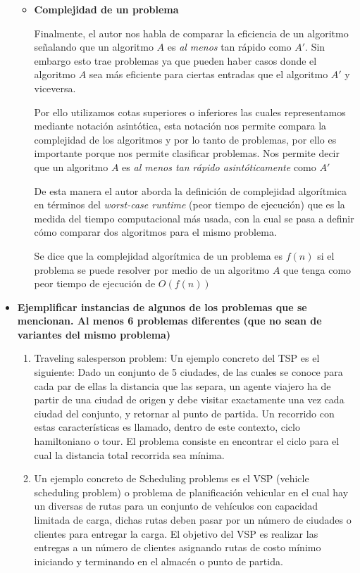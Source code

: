 \documentclass[12pt,letterpaper]{article}
\begin{document}
\begin{itemize}
\begin{itemize}[$\blacklozenge$]
    \item \textbf{Complejidad de un problema}
    
    Finalmente, el autor nos habla de comparar la eficiencia de un algoritmo señalando que un algoritmo $A$ es \textit{al menos} tan rápido como $A'$. Sin embargo esto trae problemas ya que pueden haber casos donde el algoritmo $A$ sea más eficiente para ciertas entradas que el algoritmo $A'$ y viceversa.
    
    Por ello utilizamos cotas superiores o inferiores las cuales representamos mediante notación asintótica, esta notación nos permite compara la complejidad de los algoritmos y por lo tanto de problemas, por ello es importante porque nos permite clasificar problemas. Nos permite decir que un algoritmo $A$ es \textit{al menos tan rápido asintóticamente} como $A'$
    
    De esta manera el autor aborda la definición de complejidad algorítmica en términos del \textit{worst-case runtime} (peor tiempo de ejecución) que es la medida del tiempo computacional más usada, con la cual se pasa a definir cómo comparar dos algoritmos para el mismo problema. 
    
    Se dice que la complejidad algorítmica de un problema es $f(n)$ si el problema se puede resolver por medio de un algoritmo $A$ que tenga como peor tiempo de ejecución de $O(f(n))$
\end{itemize}
\newpage
    \item \textbf{Ejemplificar instancias de algunos de los problemas que se mencionan. Al menos 6 problemas diferentes (que no sean de variantes del mismo problema)}

    \begin{enumerate}
    \item Traveling salesperson problem: Un ejemplo concreto del TSP es el siguiente: Dado un conjunto de 5 ciudades, de las cuales se conoce para cada par de ellas la distancia que las separa, un agente viajero ha de partir de una ciudad de origen y debe visitar exactamente una vez cada ciudad del conjunto, y retornar al punto de partida. Un recorrido con estas características es llamado, dentro de este contexto, ciclo hamiltoniano o tour. El problema consiste en encontrar el ciclo para el cual la distancia total recorrida sea mínima.\\
    
    \item Un ejemplo concreto de Scheduling problems es el VSP (vehicle scheduling problem) o problema de planificación vehicular en el cual hay un diversas de rutas para un conjunto de vehículos con capacidad limitada de carga, dichas rutas deben pasar por un número de ciudades o clientes para entregar la carga. El objetivo del VSP es realizar las entregas a un número de clientes asignando rutas de costo mínimo iniciando y terminando en el almacén o punto de partida.\\
    

\end{enumerate}
\end{itemize}
\end{document}

